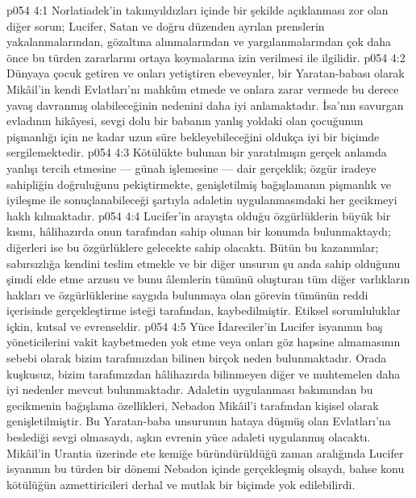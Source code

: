 \vs p054 4:1 Norlatiadek’in takımyıldızları içinde bir şekilde açıklanması zor olan diğer sorun; Lucifer, Satan ve doğru düzenden ayrılan prenslerin yakalanmalarından, gözaltına alınmalarından ve yargılanmalarından çok daha önce bu türden zararlarını ortaya koymalarına izin verilmesi ile ilgilidir.
\vs p054 4:2 Dünyaya çocuk getiren ve onları yetiştiren ebeveynler, bir Yaratan\hyp{}babası olarak Mikâil’in kendi Evlatları’nı mahkûm etmede ve onlara zarar vermede bu derece yavaş davranmış olabileceğinin nedenini daha iyi anlamaktadır. İsa’nın savurgan evladının hikâyesi, sevgi dolu bir babanın yanlış yoldaki olan çocuğunun pişmanlığı için ne kadar uzun süre bekleyebileceğini oldukça iyi bir biçimde sergilemektedir.
\vs p054 4:3 Kötülükte bulunan bir yaratılmışın gerçek anlamda yanlışı tercih etmesine --- günah işlemesine --- dair gerçeklik; özgür iradeye sahipliğin doğruluğunu pekiştirmekte, genişletilmiş bağışlamanın pişmanlık ve iyileşme ile sonuçlanabileceği şartıyla adaletin uygulanmasındaki her gecikmeyi haklı kılmaktadır.
\vs p054 4:4 Lucifer’in arayışta olduğu özgürlüklerin büyük bir kısmı, hâlihazırda onun tarafından sahip olunan bir konumda bulunmaktaydı; diğerleri ise bu özgürlüklere gelecekte sahip olacaktı. Bütün bu kazanımlar; sabırsızlığa kendini teslim etmekle ve bir diğer unsurun şu anda sahip olduğunu şimdi elde etme arzusu ve bunu âlemlerin tümünü oluşturan tüm diğer varlıkların hakları ve özgürlüklerine saygıda bulunmaya olan görevin tümünün reddi içerisinde gerçekleştirme isteği tarafından, kaybedilmiştir. Etiksel sorumluluklar içkin, kutsal ve evrenseldir.
\vs p054 4:5 Yüce İdareciler’in Lucifer isyanının baş yöneticilerini vakit kaybetmeden yok etme veya onları göz hapsine almamasının sebebi olarak bizim tarafımızdan bilinen birçok neden bulunmaktadır. Orada kuşkusuz, bizim tarafımızdan hâlihazırda bilinmeyen diğer ve muhtemelen daha iyi nedenler mevcut bulunmaktadır. Adaletin uygulanması bakımından bu gecikmenin bağışlama özellikleri, Nebadon Mikâil’i tarafından kişisel olarak genişletilmiştir. Bu Yaratan\hyp{}baba unsurunun hataya düşmüş olan Evlatları’na beslediği sevgi olmasaydı, aşkın evrenin yüce adaleti uygulanmış olacaktı. Mikâil’in Urantia üzerinde ete kemiğe büründürüldüğü zaman aralığında Lucifer isyanının bu türden bir dönemi Nebadon içinde gerçekleşmiş olsaydı, bahse konu kötülüğün azmettiricileri derhal ve mutlak bir biçimde yok edilebilirdi.
